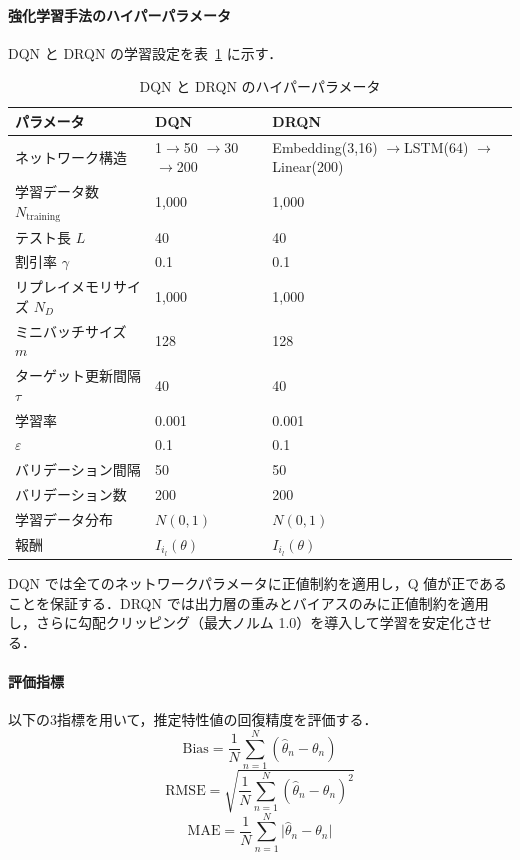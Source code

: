 \documentclass[dvipdfmx,a4j]{jarticle}
\begin{document}
\paragraph{強化学習手法のハイパーパラメータ}
DQN と DRQN の学習設定を表~\ref{tab:hyperparams} に示す．

\begin{table}[t]
\centering
\caption{DQN と DRQN のハイパーパラメータ}
\label{tab:hyperparams}
\scriptsize
\setlength{\tabcolsep}{3pt}
\begin{tabular}{p{}p{}p{}}
\toprule
パラメータ & DQN & DRQN \\
\midrule
ネットワーク構造 & \shortstack[l]{1$\to$50\\$\to$30$\to$200} & \shortstack[l]{Embedding(3,16)\\$\to$LSTM(64)\\$\to$Linear(200)} \\
学習データ数 $N_{\mathrm{training}}$ & 1,000 & 1,000 \\
テスト長 $L$ & 40 & 40 \\
割引率 $\gamma$ & 0.1 & 0.1 \\
リプレイメモリサイズ $N_D$ & 1,000 & 1,000 \\
ミニバッチサイズ $m$ & 128 & 128 \\
ターゲット更新間隔 $\tau$ & 40 & 40 \\
学習率 & 0.001 & 0.001 \\
$\varepsilon$ & 0.1 & 0.1 \\
バリデーション間隔 & 50 & 50 \\
バリデーション数 & 200 & 200 \\
学習データ分布 & $N(0,1)$ & $N(0,1)$ \\
報酬 & $I_{i_l}(\theta)$ & $I_{i_l}(\theta)$ \\
\bottomrule
\end{tabular}
\end{table}

DQN では全てのネットワークパラメータに正値制約を適用し，Q 値が正であることを保証する．DRQN では出力層の重みとバイアスのみに正値制約を適用し，さらに勾配クリッピング（最大ノルム 1.0）を導入して学習を安定化させる．

\paragraph{評価指標}
以下の3指標を用いて，推定特性値の回復精度を評価する．
\begin{equation}
\mathrm{Bias} = \frac{1}{N} \sum_{n=1}^{N} (\hat{\theta}_n - \theta_n)
\end{equation}
\begin{equation}
\mathrm{RMSE} = \sqrt{\frac{1}{N} \sum_{n=1}^{N} (\hat{\theta}_n - \theta_n)^2}
\end{equation}
\begin{equation}
\mathrm{MAE} = \frac{1}{N} \sum_{n=1}^{N} \lvert \hat{\theta}_n - \theta_n \rvert
\end{equation}
\end{document}
